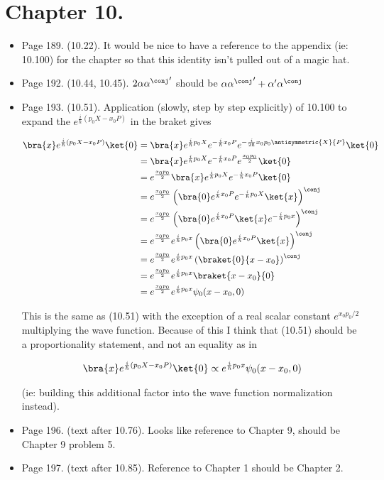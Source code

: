 \section{Chapter 10.}
\begin{itemize}
\item Page 189.  (10.22).  It would be nice to have a reference to the appendix (ie: 10.100) for the chapter so that this identity isn't pulled out of a magic hat.
\item Page 192.  (10.44, 10.45).  $2 \alpha {\alpha^\conj}'$ should be $\alpha {\alpha^\conj}' + \alpha' \alpha^\conj$
\item Page 193.  (10.51).  Application (slowly, step by step explicitly) of 10.100 to expand the $e^{\frac{i}{\hbar}(p_0 X - x_0 P)}$ in the braket gives

\begin{align*}
\bra{x} e^{\frac{i}{\hbar}(p_0 X - x_0 P)} \ket{0}
&=
\bra{x} e^{\frac{i}{\hbar}p_0 X }
e^{-\frac{i}{\hbar}x_0 P}
e^{-\frac{i}{2\hbar}x_0 p_0 \antisymmetric{X}{P}}
\ket{0} \\
&=
\bra{x} e^{\frac{i}{\hbar}p_0 X }
e^{-\frac{i}{\hbar}x_0 P}
e^{\frac{x_0 p_0}{2} }
\ket{0} \\
&=
e^{\frac{x_0 p_0}{2} }
\bra{x} e^{\frac{i}{\hbar}p_0 X} 
e^{-\frac{i}{\hbar}x_0 P}
\ket{0} \\
&=
e^{\frac{x_0 p_0}{2} }
\left(
\bra{0} 
e^{\frac{i}{\hbar}x_0 P}
e^{-\frac{i}{\hbar}p_0 X} 
\ket{x}\right)^\conj \\
&=
e^{\frac{x_0 p_0}{2} }
\left(
\bra{0} 
e^{\frac{i}{\hbar}x_0 P}
\ket{x}
e^{-\frac{i}{\hbar}p_0 x} 
\right)^\conj \\
&=
e^{\frac{x_0 p_0}{2} } e^{\frac{i}{\hbar}p_0 x} 
\left(
\bra{0} 
e^{\frac{i}{\hbar}x_0 P}
\ket{x}
\right)^\conj \\
&=
e^{\frac{x_0 p_0}{2} } e^{\frac{i}{\hbar}p_0 x} 
\left(
\braket{0}{x - x_0}
\right)^\conj \\
&=
e^{\frac{x_0 p_0}{2} } e^{\frac{i}{\hbar}p_0 x} 
\braket{x - x_0}{0} \\
&=
e^{\frac{x_0 p_0}{2} } e^{\frac{i}{\hbar}p_0 x} 
\psi_0(x - x_0, 0)
\end{align*}

This is the same as (10.51) with the exception of a real scalar constant $e^{ x_0 p_0/2}$ multiplying the wave function.  Because of this I think that (10.51) should be a proportionality statement, and not an equality as in

\begin{align*}
\bra{x} e^{\frac{i}{\hbar}(p_0 X - x_0 P)} \ket{0} \propto
e^{\frac{i}{\hbar}p_0 x} \psi_0(x - x_0, 0)
\end{align*}

(ie: building this additional factor into the wave function normalization instead).
\item Page 196.  (text after 10.76).  Looks like reference to Chapter 9, should be Chapter 9 problem 5.

\item Page 197.  (text after 10.85).  Reference to Chapter 1 should be Chapter 2.
\end{itemize}

